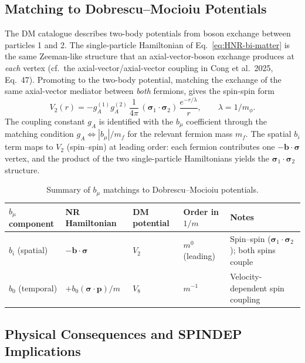 \documentclass[main]{subfiles}
\begin{document}
\subsection{Matching to Dobrescu--Mocioiu Potentials}

The DM catalogue describes two-body potentials from boson exchange between
particles 1 and 2. The single-particle Hamiltonian of
Eq.~\eqref{eq:HNR-bi-matter} is the same Zeeman-like structure that an
axial-vector-boson exchange produces at \emph{each} vertex (cf.\ the
axial-vector/axial-vector coupling in Cong et al.\ 2025, Eq.~47). Promoting
to the two-body potential, matching the exchange of the same axial-vector
mediator between \emph{both} fermions, gives the spin-spin form
\begin{equation}
  V_2(r) = -g_A^{(1)}g_A^{(2)}\,\frac{1}{4\pi}\,
  (\boldsymbol\sigma_1\cdot\boldsymbol\sigma_2)\,\frac{e^{-r/\lambda}}{r},
  \qquad \lambda = 1/m_\phi. \label{eq:V2-final}
\end{equation}
The coupling constant $g_A$ is identified with the $b_\mu$ coefficient
through the matching condition $g_A\Leftrightarrow|b_\mu|/m_f$ for the
relevant fermion mass $m_f$. The spatial $b_i$ term maps to $V_2$
(spin--spin) at leading order: each fermion contributes one
$-\mathbf b\cdot\boldsymbol\sigma$ vertex, and the product of the two
single-particle Hamiltonians yields the $\boldsymbol\sigma_1\cdot\boldsymbol\sigma_2$
structure.

\begin{table}[h]
\centering
\begin{tabular}{@{}l l l l >{\raggedright\arraybackslash}p{3cm}@{}}
\toprule
$b_\mu$ component & NR Hamiltonian & DM potential & Order in $1/m$ & Notes \\
\midrule
$b_i$ (spatial)  & $-\mathbf b\cdot\boldsymbol\sigma$          & $V_2$      & $m^0$ (leading) & Spin--spin ($\boldsymbol\sigma_1\cdot\boldsymbol\sigma_2$); both spins couple \\
$b_0$ (temporal) & $+b_0(\boldsymbol\sigma\cdot\mathbf p)/m$   & $V_8$ & $m^{-1}$        & Velocity-dependent spin coupling \\
\bottomrule
\end{tabular}
\caption{Summary of $b_\mu$ matchings to Dobrescu--Mocioiu potentials.}
\end{table}

\subsection{Physical Consequences and SPINDEP Implications}
\end{document}
